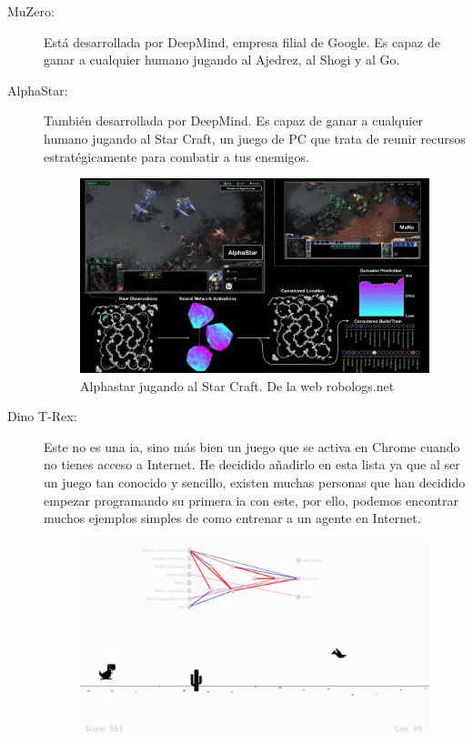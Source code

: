 \begin{description}
	\item[MuZero:] Está desarrollada por DeepMind, empresa filial de  Google. Es capaz de ganar a cualquier humano jugando al Ajedrez, al Shogi y al Go.
	\item[AlphaStar:] También desarrollada por DeepMind. Es capaz de ganar a cualquier humano jugando al Star Craft, un juego de PC que trata de reunir recursos estratégicamente para combatir a tus enemigos.
	\begin{figure}[h]
		\centering
		\includegraphics[width=15cm]{archivos/imagenes/alphastar-playing.png}
		\caption{Alphastar jugando al Star Craft. De la web robologs.net}
	\end{figure}
	\item[Dino T-Rex:] Este no es una \gls{ia}, sino más bien un juego que se activa en Chrome cuando no tienes acceso a Internet. He decidido añadirlo en esta lista ya que al ser un juego tan conocido y sencillo, existen muchas personas que han decidido empezar programando su primera \gls{ia} con este, por ello, podemos encontrar muchos ejemplos simples de como entrenar a un agente en Internet.
	\begin{figure}[h]
		\centering
		\includegraphics[width=15cm]{archivos/imagenes/dino-trex-ia.png}

\end{figure}
\end{description}
